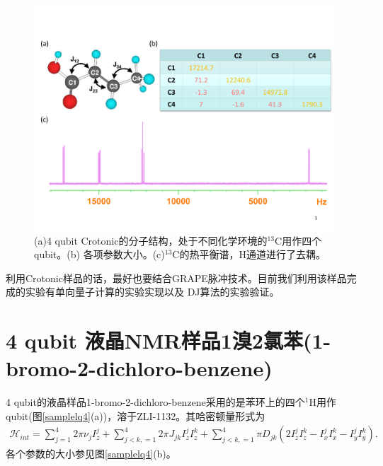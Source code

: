 \begin{figure}[htbp]
            \begin{center}
              \includegraphics[width= 0.8\columnwidth]{figures/samplecrotonic.pdf}
              \caption{(a)4 qubit Crotonic的分子结构，处于不同化学环境的$^{13}$C用作四个qubit。(b) 各项参数大小。(c)$^{13}$C的热平衡谱，H通道进行了去耦。}
              \label{samplecrotonic}
            \end{center}
\end{figure}

利用Crotonic样品的话，最好也要结合GRAPE脉冲技术。目前我们利用该样品完成的实验有单向量子计算的实验实现\cite{app26}以及
DJ算法的实验验证\cite{app27}。

\section{4 qubit 液晶NMR样品1溴2氯苯(1-bromo-2-dichloro-benzene)}

4 qubit的液晶样品1-bromo-2-dichloro-benzene采用的是苯环上的四个$^{1}$H用作qubit(图\ref{samplelq4}(a))，溶于ZLI-1132。其哈密顿量形式为
\begin{eqnarray}
\mathcal{H}_{int}=\sum\limits_{j=1}^4 {2\pi \nu _j } I_z^j  + \sum\limits_{j < k,=1}^4 {2\pi} J_{jk} I_z^j I_z^k+\sum\limits_{j < k,=1}^4 {\pi} D_{jk}(2I_z^jI_z^k-I_x^jI_x^k-I_y^jI_y^k).
\end{eqnarray}
各个参数的大小参见图\ref{samplelq4}(b)。

